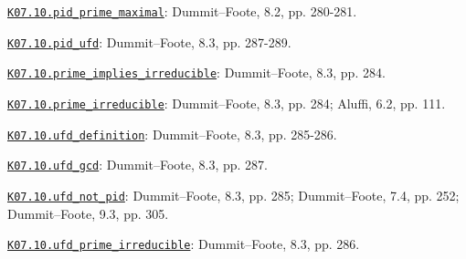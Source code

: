 \par\smallskip\noindent\hypertarget{src:K07.10.pid_prime_maximal}{}\label{src:K07.10.pid_prime_maximal}\hyperref[K07.10.pid_prime_maximal]{\texttt{K07.10.pid\_prime\_maximal}}: Dummit--Foote, 8.2, pp. 280-281.
\par\smallskip\noindent\hypertarget{src:K07.10.pid_ufd}{}\label{src:K07.10.pid_ufd}\hyperref[K07.10.pid_ufd]{\texttt{K07.10.pid\_ufd}}: Dummit--Foote, 8.3, pp. 287-289.
\par\smallskip\noindent\hypertarget{src:K07.10.prime_implies_irreducible}{}\label{src:K07.10.prime_implies_irreducible}\hyperref[K07.10.prime_implies_irreducible]{\texttt{K07.10.prime\_implies\_irreducible}}: Dummit--Foote, 8.3, pp. 284.
\par\smallskip\noindent\hypertarget{src:K07.10.prime_irreducible}{}\label{src:K07.10.prime_irreducible}\hyperref[K07.10.prime_irreducible]{\texttt{K07.10.prime\_irreducible}}: Dummit--Foote, 8.3, pp. 284; Aluffi, 6.2, pp. 111.
\par\smallskip\noindent\hypertarget{src:K07.10.ufd_definition}{}\label{src:K07.10.ufd_definition}\hyperref[K07.10.ufd_definition]{\texttt{K07.10.ufd\_definition}}: Dummit--Foote, 8.3, pp. 285-286.
\par\smallskip\noindent\hypertarget{src:K07.10.ufd_gcd}{}\label{src:K07.10.ufd_gcd}\hyperref[K07.10.ufd_gcd]{\texttt{K07.10.ufd\_gcd}}: Dummit--Foote, 8.3, pp. 287.
\par\smallskip\noindent\hypertarget{src:K07.10.ufd_not_pid}{}\label{src:K07.10.ufd_not_pid}\hyperref[K07.10.ufd_not_pid]{\texttt{K07.10.ufd\_not\_pid}}: Dummit--Foote, 8.3, pp. 285; Dummit--Foote, 7.4, pp. 252; Dummit--Foote, 9.3, pp. 305.
\par\smallskip\noindent\hypertarget{src:K07.10.ufd_prime_irreducible}{}\label{src:K07.10.ufd_prime_irreducible}\hyperref[K07.10.ufd_prime_irreducible]{\texttt{K07.10.ufd\_prime\_irreducible}}: Dummit--Foote, 8.3, pp. 286.
